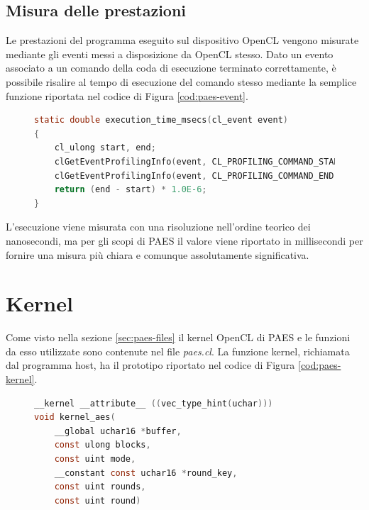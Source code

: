 \documentclass[12pt,a4paper,oneside]{book}
\begin{document}
\subsection{Misura delle prestazioni}

Le prestazioni del programma eseguito sul dispositivo \ac{OpenCL} vengono misurate mediante gli eventi messi a disposizione da \ac{OpenCL} stesso. Dato un evento associato a un comando della coda di esecuzione terminato correttamente, è possibile risalire al tempo di esecuzione del comando stesso mediante la semplice funzione riportata nel codice di Figura \ref{cod:paes-event}.

\begin{figure}
\begin{lstlisting}[caption={\textit{Misura delle prestazioni di un comando tramite eventi.}},label={cod:paes-event},language=C]
static double execution_time_msecs(cl_event event)
{
	cl_ulong start, end;
	clGetEventProfilingInfo(event, CL_PROFILING_COMMAND_START, sizeof(cl_ulong), &start, NULL);
	clGetEventProfilingInfo(event, CL_PROFILING_COMMAND_END, sizeof(cl_ulong), &end, NULL);
	return (end - start) * 1.0E-6;
}
\end{lstlisting}
\end{figure}

L'esecuzione viene misurata con una risoluzione nell'ordine teorico dei nanosecondi, ma per gli scopi di PAES il valore viene riportato in millisecondi per fornire una misura più chiara e comunque assolutamente significativa.

\section{Kernel}
\label{sec:paes-kernel}

Come visto nella sezione \ref{sec:paes-files} il kernel \ac{OpenCL} di PAES e le funzioni da esso utilizzate sono contenute nel file \textit{paes.cl}. La funzione kernel, richiamata dal programma host, ha il prototipo riportato nel codice di Figura \ref{cod:paes-kernel}.

\begin{figure}
\begin{lstlisting}[caption={\textit{Prototipo del kernel di PAES.}},label={cod:paes-kernel},language=C]
__kernel __attribute__ ((vec_type_hint(uchar)))
void kernel_aes(
	__global uchar16 *buffer, 
	const ulong blocks, 
	const uint mode, 
	__constant const uchar16 *round_key, 
	const uint rounds, 
	const uint round)
\end{lstlisting}
\end{figure}
\end{document}
